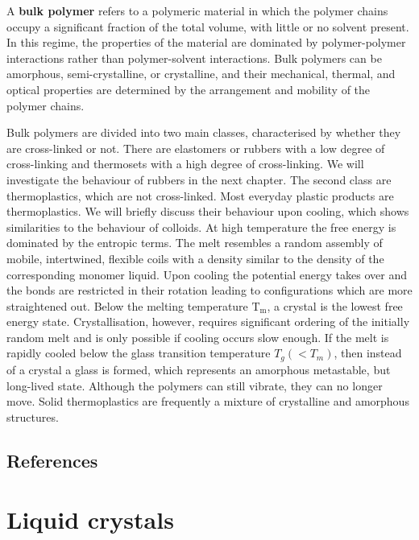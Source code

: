 \documentclass[
  letterpaper,
  enabledeprecatedfontcommands]{report}
\begin{document}
A \textbf{bulk polymer} refers to a polymeric material in which the
polymer chains occupy a significant fraction of the total volume, with
little or no solvent present. In this regime, the properties of the
material are dominated by polymer-polymer interactions rather than
polymer-solvent interactions. Bulk polymers can be amorphous,
semi-crystalline, or crystalline, and their mechanical, thermal, and
optical properties are determined by the arrangement and mobility of the
polymer chains.

Bulk polymers are divided into two main classes, characterised by
whether they are cross-linked or not. There are elastomers or rubbers
with a low degree of cross-linking and thermosets with a high degree of
cross-linking. We will investigate the behaviour of rubbers in the next
chapter. The second class are thermoplastics, which are not
cross-linked. Most everyday plastic products are thermoplastics. We will
briefly discuss their behaviour upon cooling, which shows similarities
to the behaviour of colloids. At high temperature the free energy is
dominated by the entropic terms. The melt resembles a random assembly of
mobile, intertwined, flexible coils with a density similar to the
density of the corresponding monomer liquid. Upon cooling the potential
energy takes over and the bonds are restricted in their rotation leading
to configurations which are more straightened out. Below the melting
temperature \(\mathrm{T}_{\mathrm{m}}\), a crystal is the lowest free
energy state. Crystallisation, however, requires significant ordering of
the initially random melt and is only possible if cooling occurs slow
enough. If the melt is rapidly cooled below the glass transition
temperature \(T_{g}\left(<T_{m}\right)\), then instead of a crystal a
glass is formed, which represents an amorphous metastable, but
long-lived state. Although the polymers can still vibrate, they can no
longer move. Solid thermoplastics are frequently a mixture of
crystalline and amorphous structures.

\section*{References}\label{references-1}


\chapter{Liquid crystals}\label{liquid-crystals-1}
\end{document}
